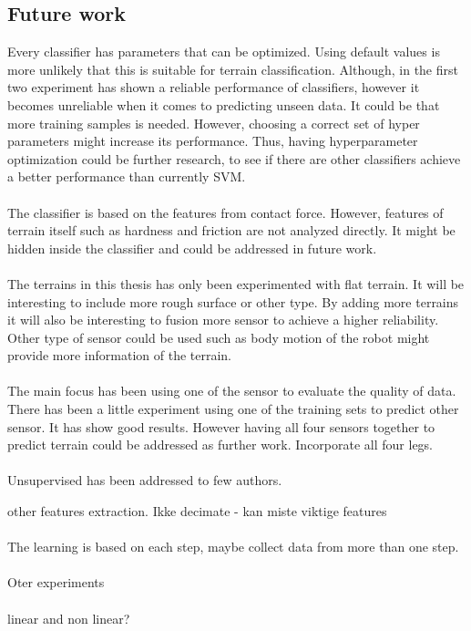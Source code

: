 \documentclass[USenglish]{ifimaster}  %
\begin{document}
	
\subsection{Future work}
Every classifier has parameters that can be optimized. Using default values is more unlikely that this is suitable for terrain classification. Although, in the first two experiment has shown a reliable performance of classifiers, however it becomes unreliable when it comes to predicting unseen data. It could be that more training samples is needed. However, choosing a correct set of hyper parameters might increase its performance. Thus, having hyperparameter optimization could be further research, to see if there are other classifiers achieve a better performance than currently SVM.
\\
\\
The classifier is based on the features from contact force. However, features of terrain itself such as hardness and friction are not analyzed directly. It might be hidden inside the classifier and could be addressed in future work. 
\\
\\
The terrains in this thesis has only been experimented with flat terrain. It will be interesting to include more rough surface or other type. By adding more terrains it will also be interesting to fusion more sensor to achieve a higher reliability. Other type of sensor could be used such as body motion of the robot might provide more information of the terrain.  
\\
\\
The main focus has been using one of the sensor to evaluate the quality of data. There has been a little experiment using one of the training sets to predict other sensor. It has show good results. However having all four sensors together to predict terrain could be addressed as further work. Incorporate all four legs. 
\\
\\
Unsupervised has been addressed to few authors.
	
	other features extraction.
	Ikke decimate - kan miste viktige features
	\\
	\\
	The learning is based on each step, maybe collect data from more than one step.
	\\
	\\
	Oter experiments
	\\
	\\
	linear and non linear?
	
	
	
	
	\backmatter{}
	
	
\end{document}

